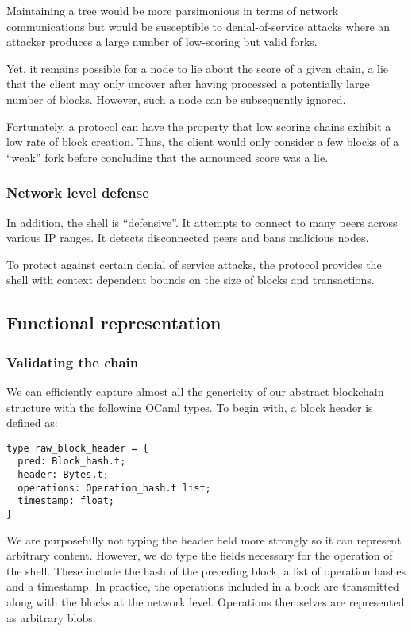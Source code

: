 \documentclass[letterpaper]{article}
\begin{document}
Maintaining a tree would be more parsimonious in terms of network communications
but would be susceptible to denial-of-service attacks where an attacker produces
a large number of low-scoring but valid forks.

Yet, it remains possible for a node to lie about the score of a given
chain, a lie that the client may only uncover after having processed a
potentially large number of blocks. However, such a node can be subsequently
ignored.

Fortunately, a protocol can have the property that low scoring chains exhibit a
low rate of block creation. Thus, the client would only consider a few blocks of
a ``weak'' fork before concluding that the announced score was a lie.

\subsubsection{Network level defense}
In addition, the shell is ``defensive''.
It attempts to connect to many peers across various IP ranges. It detects
disconnected peers and bans malicious nodes.

To protect against certain denial of service attacks, the protocol provides the
shell with context dependent bounds on the size of blocks and transactions.

\subsection{Functional representation}

\subsubsection{Validating the chain}

We can efficiently capture almost all the genericity
of our abstract blockchain structure with the following OCaml types.
To begin with, a block header is defined as:

\lstset{
  language=[Objective]Caml
}
\begin{lstlisting}
type raw_block_header = {
  pred: Block_hash.t;
  header: Bytes.t;
  operations: Operation_hash.t list;
  timestamp: float;
}
\end{lstlisting}

We are purposefully not typing the header field more strongly so it can
represent arbitrary content. However, we do type the fields necessary for the
operation of the shell. These include the hash of the preceding block, a list of
operation hashes and a timestamp. In practice, the operations included in a
block are transmitted along with the blocks at the network level. Operations
themselves are represented as arbitrary blobs.
\end{document}
